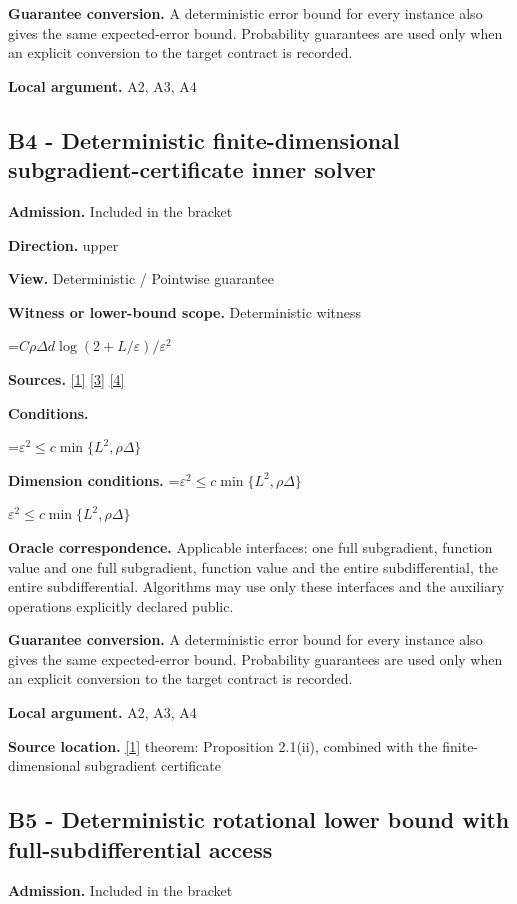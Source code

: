 \documentclass[10pt,a4paper]{article}
\newcommand{\AtlasMath}[1]{\par\begingroup\centering\setbox0=\hbox{$\displaystyle #1$}\ifdim\wd0>1.4\linewidth\typeout{ATLAS WIDE FORMULA: \the\wd0}\fi\ifdim\wd0>\linewidth\resizebox{\linewidth}{!}{\box0}\else\box0\fi\par\endgroup}
\newcommand{\AtlasInlineMath}[1]{\begingroup\setbox0=\hbox{$#1$}\ifdim\wd0>.4\linewidth\endgroup\AtlasMath{#1}\else\endgroup$#1$\fi}
\begin{document}
\textbf{Guarantee conversion.} A deterministic error bound for every instance also gives the same expected-error bound. Probability guarantees are used only when an explicit conversion to the target contract is recorded.

\textbf{Local argument.} A2, A3, A4

\subsection{B4 - Deterministic finite-dimensional subgradient-certificate inner solver}
\textbf{Admission.} Included in the bracket

\textbf{Direction.} upper

\textbf{View.} Deterministic / Pointwise guarantee

\textbf{Witness or lower-bound scope.} Deterministic witness

\AtlasMath{C\rho\Delta d\log(2+L/\varepsilon)/\varepsilon^2}
\textbf{Sources.} \href{https://www2.isye.gatech.edu/~nemirovs/MOR_AccuracyCertificates.pdf}{[1]} \href{https://arxiv.org/pdf/1405.4980}{[3]} \href{https://arxiv.org/pdf/2609.20701}{[4]}

\textbf{Conditions.} 
\AtlasMath{\varepsilon^2\le c\min\{L^2,\rho\Delta\}}


\textbf{Dimension conditions.} \AtlasInlineMath{\varepsilon^2\le c\min\{L^2,\rho\Delta\}}

\textbf{Oracle correspondence.} Applicable interfaces: one full subgradient, function value and one full subgradient, function value and the entire subdifferential, the entire subdifferential. Algorithms may use only these interfaces and the auxiliary operations explicitly declared public.

\textbf{Guarantee conversion.} A deterministic error bound for every instance also gives the same expected-error bound. Probability guarantees are used only when an explicit conversion to the target contract is recorded.

\textbf{Local argument.} A2, A3, A4

\textbf{Source location.} \href{https://www2.isye.gatech.edu/~nemirovs/MOR_AccuracyCertificates.pdf}{[1]} theorem: Proposition 2.1(ii), combined with the finite-dimensional subgradient certificate

\subsection{B5 - Deterministic rotational lower bound with full-subdifferential access}
\textbf{Admission.} Included in the bracket
\end{document}
